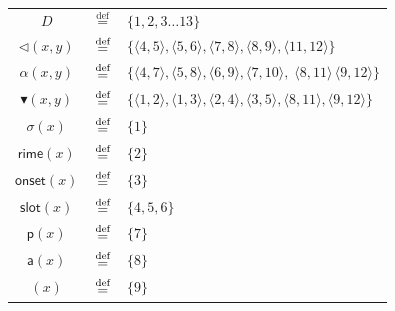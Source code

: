 \begin{figure}[ht]
\begin{minipage}[b]{0.2\textwidth}
\begin{tikzpicture}[
		node distance=1cm,
		every node/.style={circle, draw, inner sep=2pt},
		a/.style={->},    
		]
	\end{tikzpicture}
	\end{minipage} \hfill \vspace{-10cm}
	\begin{tabular}{ccl}
		\hline
  $D$& $\stackrel{\text{def}}{=}$ & $\{1, 2, 3 \ldots 13\}$\\                                                                                                   
  $\lhd(x,y)$        &          $\defeq$          & $\{\langle4,5\rangle,\langle5,6\rangle,\langle
7,8\rangle,\langle 8,9 \rangle, \langle 11,12 \rangle\}$                           \\
		      $\alpha(x,y)$       &          $\defeq$          & $\{\langle4,7\rangle,\langle5,8\rangle,\langle 6,9
\rangle,\langle 7,10\rangle,\; \langle 8,11 \rangle \,\langle 9,12 \rangle \}$ \\
		$\blacktriangledown(x,y)$ &          $\defeq$          & $\{\langle 1,2\rangle,\langle1,3\rangle,\langle 2,4 \rangle,\langle
3,5\rangle,
\langle 8,11 \rangle,\langle 9,12 \rangle \}$     \\ \hline
		  $\mathsf{\sigma}(x)$    &          $\defeq$          & $\{1\}$                                                                                                                           \\
		   $\mathsf{rime}(x)$     &          $\defeq$          & $\{2\}$                                                                                                                           \\
		   $\mathsf{onset}(x)$    &          $\defeq$          & $\{3\}$                                                                                                                           \\
		   $\mathsf{slot}(x)$     &          $\defeq$          & $ \{4,5,6\}$                                                                                                                      \\ \hline
		     $\mathsf{p}(x)$      &          $\defeq$          & $\{7\}$                                                                                                                           \\
		    ${\mathsf{a}}(x)$     &          $\defeq$          & $\{8\}$                                                                                                                           \\
		  {\textglotstop}$(x)$    &          $\defeq$          & $\{9\}$                                                                                                                           \\

\end{tabular}
\end{figure}
